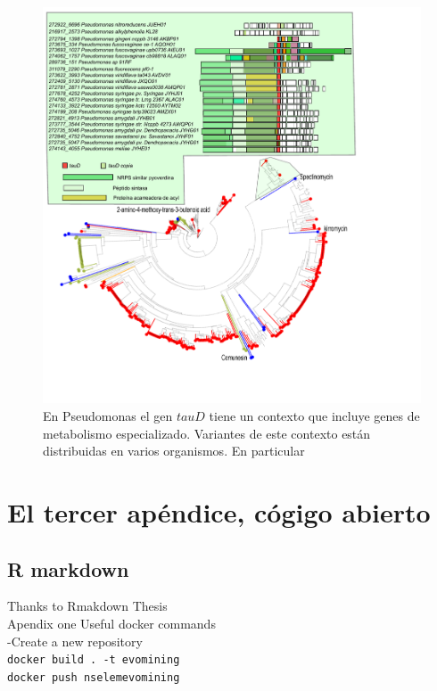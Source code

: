 \documentclass[12pt,twoside]{reedthesis}
\begin{document}
  \begin{figure}[h!tbp]
  \centering
  \includegraphics[angle = 0,scale = .9]{chapter3/PseudomonasTauD.pdf}
  \caption[EvoMining Algorithm]{\footnotesize{En Pseudomonas el gen $tauD$ tiene un contexto que incluye genes de metabolismo especializado. Variantes de este contexto están distribuidas en varios organismos. En particular  }}
  \label{fig:PseudomonasTauD}
  \end{figure}
  
  \chapter{El tercer apéndice, cógigo
  abierto}\label{el-tercer-apendice-cogigo-abierto}
  
  \section{R markdown}\label{r-markdown}
  
  Thanks to Rmakdown Thesis\\
  Apendix one Useful docker commands\\
  -Create a new repository\\
  \texttt{docker\ build\ .\ -t\ evomining}\\
  \texttt{docker\ push\ nselemevomining}
  
\end{document}
